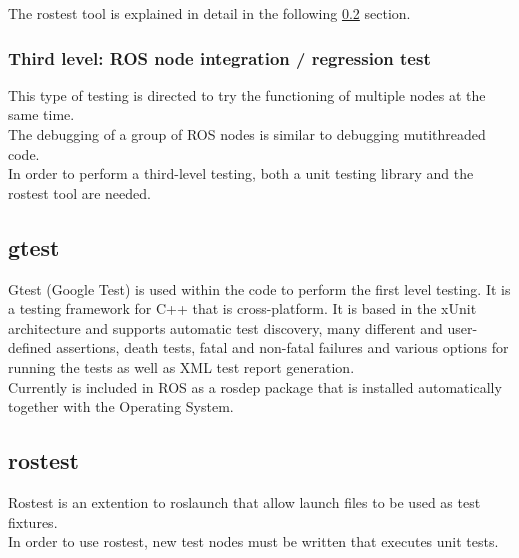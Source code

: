 The rostest tool is explained in detail in the following \ref{rostest} section.

	\subsubsection{Third level: ROS node integration / regression test}
	This type of testing is directed to try the functioning of multiple nodes at the same time. \\

	The debugging of a group of ROS nodes is similar to debugging mutithreaded code. \\

	In order to perform a third-level testing, both a unit testing library and the rostest tool are needed. 

\subsection{gtest}
\label{gtest}
Gtest (Google Test) is used within the code to perform the first level testing. It is a testing framework for C++ that is cross-platform. It is based in the xUnit architecture and supports automatic test discovery, many different and user-defined assertions, death tests, fatal and non-fatal failures and various options for running the tests as well as XML test report generation. 
\\

Currently is included in ROS as a rosdep package that is installed automatically together with the Operating System. 


\subsection{rostest}
\label{rostest}
Rostest is an extention to roslaunch that allow launch files to be used as test fixtures. 
\\

In order to use rostest, new test nodes must be written that executes unit tests. 